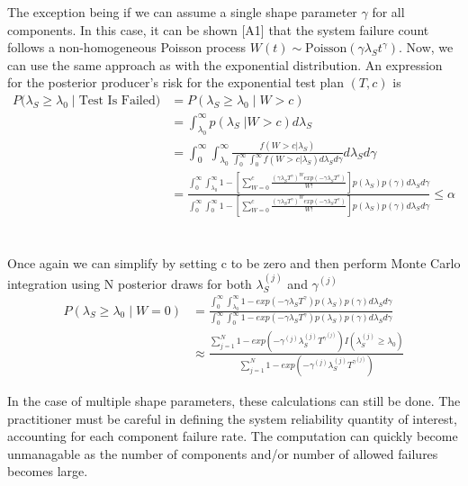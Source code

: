 \documentclass[12pt]{article}
\begin{document}
The exception being
if we can assume a single shape parameter $\gamma$ for all components.  In this
case, it can be shown [A1] that the system failure count follows a non-homogeneous
Poisson process $W(t) \sim \text{Poisson}(\gamma \lambda_S t^{\gamma})$.  Now,
we can use the same approach as with the exponential distribution. An expression
for the posterior producer's risk for the exponential test plan $(T,c)$ is
$$
\begin{aligned}
    P(\lambda_S \geq \lambda_0 \; \vert \; \text{Test Is Failed)} &= P(\lambda_S
    \geq \lambda_0 \; \vert \; W > c) \\ &= \int_{\lambda_0}^{\infty}
    p(\lambda_S \; \vert W > c) d\lambda_S \\ &= \int_{0}^{\infty}
    \int_{\lambda_0}^{\infty} \frac{f(W > c \vert \lambda_S)}{\int_{0}^{\infty}
    \int_{0}^{\infty} f(W > c \vert \lambda_S) d\lambda_S d\gamma} d\lambda_S
    d\gamma \\ &= \frac{\int_{0}^{\infty} \int_{\lambda_0}^{\infty} 1 -
    [\sum_{W=0}^c \frac{(\gamma \lambda_S T^{\gamma})^W exp(-\gamma \lambda_S
    T^{\gamma})}{W!}]p(\lambda_S)p(\gamma)d\lambda_S d\gamma} {\int_{0}^{\infty}
    \int_{0}^{\infty} 1 - [ \sum_{W=0}^c \frac{(\gamma \lambda_S T^{\gamma})^W
    exp(-\gamma \lambda_S T^{\gamma})} {W!}]p(\lambda_S) p(\gamma)
    d\lambda_Sd\gamma} \leq \alpha
\end{aligned}
$$
\\
\\
Once again we can simplify by setting c to be zero and then perform Monte Carlo
integration using N posterior draws for both $\lambda_S^{(j)}$ and
$\gamma^{(j)}$
$$
\begin{aligned}
	 P(\lambda_S \geq \lambda_0 \; \vert \; W = 0) &= \frac{\int_{0}^{\infty}
	 \int_{\lambda_0}^{\infty} 1 - exp(- \gamma \lambda_S T^{\gamma})p(\lambda_S)
	 p(\gamma) d\lambda_S d\gamma} {\int_{0}^{\infty} \int_{0}^{\infty} 1 - exp(-
	 \gamma \lambda_S T^{\gamma})p(\lambda_S) p(\gamma) d\lambda_S d\gamma} \\
	 &\approx \frac{\sum_{j = 1}^{N} 1 - exp(-\gamma^{(j)} \lambda_S^{(j)}
	 T^{\gamma^{(j)}}) I(\lambda_S^{(j)} \geq \lambda_0)} {\sum_{j = 1}^{N} 1 -
	 exp(- \gamma^{(j)} \lambda_S^{(j)} T^{\gamma^{(j)}})} \end{aligned}
$$

In the case of multiple shape parameters, these calculations can still be done.
The practitioner must be careful in defining the system reliability quantity of
interest, accounting for each component failure rate.  The computation can
quickly become  unmanagable as the number of components and/or number of allowed
failures becomes large.
\end{document}
